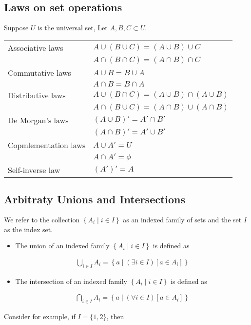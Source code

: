 \documentclass[12pt,a4paper]{article}
\begin{document}
      \subsection{Laws on set operations} 
       Suppose \(U\) is the universal set, Let \(A, B, C \subset U\).

       \begin{tabular}{|l||l|}
        \hline Associative laws & \(A \cup(B \cup C)=(A \cup B) \cup C\) \\
        & \(A \cap(B \cap C)=(A \cap B) \cap C\) \\
        \hline Commutative laws & \(A \cup B = B \cup A\) \\
        & \(A \cap B = B \cap A\) \\
        \hline Distributive laws & \(A \cup \left( B \cap C \right) = \left( A \cup B  \right) \cap \left( A \cup B \right) \) \\
        & \(A \cap \left( B \cup C \right) = \left( A \cap B \right) \cup \left( A \cap B \right) \) \\
        \hline De Morgan's laws & \(\left( A \cup B \right)' = A' \cap B'\) \\
        & \(\left( A \cap B  \right)' = A' \cup B'\) \\
        \hline Copmlementation laws & \(A \cup A' = U\) \\
        & \(A \cap A'= \phi \) \\
        \hline Self-inverse law & \( \left( A' \right)' = A \) \\         
        \hline 
      \end{tabular}  
    
     \subsection{Arbitraty Unions and Intersections} 
    We refer to the collection \(\left \{A_i \mid i \in I\right \} \) as an indexed family of sets and the set \(I\) as the index set.
    \begin{itemize}
        \item The union of an indexed family \(\left \{A_i \mid i \in I\right \} \) is defined as

        \begin{align*}
        \bigcup_{i \in I} A_i=\left \{a \mid(\exists i \in I)\left[a \in A_i\right]\right \}
        \end{align*}

        \item The intersection of an indexed family \(\left \{A_i \mid i \in I\right \} \) is defined as

        \begin{align*}
        \bigcap_{i \in I} A_i=\left \{a \mid(\forall i \in I)\left[a \in A_i\right]\right \}
        \end{align*}
    \end{itemize}
Consider for example, if \(I=\{1,2\} \), then 
\end{document}
